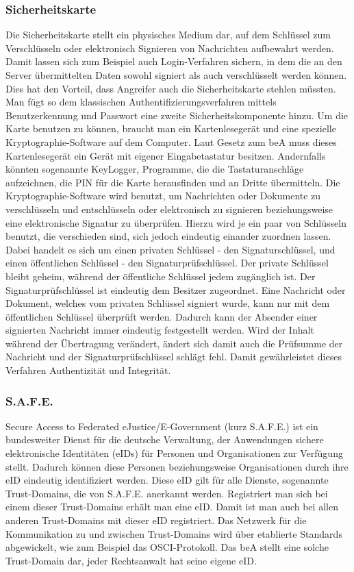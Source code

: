 \subsubsection{Sicherheitskarte}
Die Sicherheitskarte stellt ein physisches Medium dar, auf dem Schlüssel zum Verschlüsseln oder elektronisch Signieren von Nachrichten aufbewahrt werden. Damit lassen sich zum Beispiel auch Login-Verfahren sichern, in dem die an den Server übermittelten Daten sowohl signiert als auch verschlüsselt werden können. Dies hat den Vorteil, dass Angreifer auch die Sicherheitskarte stehlen müssten. Man fügt so dem klassischen Authentifizierungsverfahren mittels Benutzerkennung und Passwort eine zweite Sicherheitskomponente hinzu. Um die Karte benutzen zu können, braucht man ein Kartenlesegerät und eine spezielle Kryptographie-Software auf dem Computer. Laut Gesetz zum beA muss dieses Kartenlesegerät ein Gerät mit eigener Eingabetastatur besitzen. Andernfalls könnten sogenannte KeyLogger, Programme, die die Tastaturanschläge aufzeichnen, die PIN für die Karte herausfinden und an Dritte übermitteln. Die Kryptographie-Software wird benutzt, um Nachrichten oder Dokumente zu verschlüsseln und entschlüsseln oder elektronisch zu signieren beziehungsweise eine elektronische Signatur zu überprüfen. Hierzu wird je ein paar von Schlüsseln benutzt, die verschieden sind, sich jedoch eindeutig einander zuordnen lassen. Dabei handelt es sich um einen privaten Schlüssel - den Signaturschlüssel, und einen öffentlichen Schlüssel - den Signaturprüfschlüssel. Der private Schlüssel bleibt geheim, während der öffentliche Schlüssel jedem zugänglich ist. Der Signaturprüfschlüssel ist eindeutig dem Besitzer zugeordnet. Eine Nachricht oder Dokument, welches vom privaten Schlüssel signiert wurde, kann nur mit dem öffentlichen Schlüssel überprüft werden. Dadurch kann der Absender einer signierten Nachricht immer eindeutig festgestellt werden. Wird der Inhalt während der Übertragung verändert, ändert sich damit auch die Prüfsumme der Nachricht und der Signaturprüfschlüssel schlägt fehl. Damit gewährleistet dieses Verfahren Authentizität und Integrität.

\subsubsection{S.A.F.E.}
Secure Access to Federated eJustice/E-Government (kurz S.A.F.E.) ist ein bundesweiter Dienst für die deutsche Verwaltung, der Anwendungen sichere elektronische Identitäten (eIDs) für Personen und Organisationen zur Verfügung stellt. Dadurch können diese Personen beziehungsweise Organisationen durch ihre eID eindeutig identifiziert werden. \textcite{bea:safe}  Diese eID gilt für alle Dienste, sogenannte Trust-Domains, die von S.A.F.E. anerkannt werden. Registriert man sich bei einem dieser Trust-Domains erhält man eine eID. Damit ist man auch bei allen anderen Trust-Domains mit dieser eID registriert. Das Netzwerk für die Kommunikation zu und zwischen Trust-Domains wird über etablierte Standards abgewickelt, wie zum Beispiel das OSCI-Protokoll. Das beA stellt eine solche Trust-Domain dar, jeder Rechtsanwalt hat seine eigene eID.

